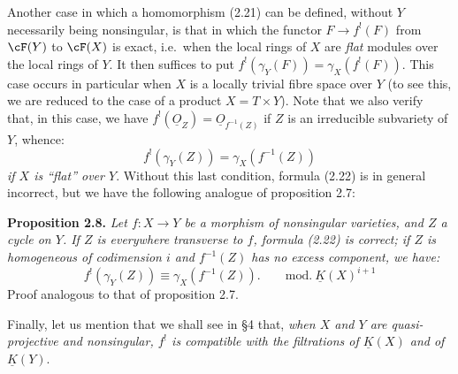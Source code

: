 Another case in which a homomorphism (2.21) can be defined, without $Y$ necessarily being nonsingular, is that in which the functor $F\to f^!(F)$ from $\cF(Y)$ to $\cF(X)$ is exact, i.e.\ when the local rings of $X$ are \emph{flat} modules over the local rings of $Y$. It then suffices to put $f^!(\gamma_Y(F))=\gamma_X(f^!(F))$.
This case occurs in particular when $X$ is a locally trivial fibre space over $Y$ (to see this, we are reduced to the case of a product $X=T\times Y$). Note that we also verify that, in this case, we have $f^!(\underline{O}_Z)=\underline{O}_{f^{-1}(Z)}$ if $Z$ is an irreducible subvariety of $Y$, whence:
\begin{equation}\tag{2.22}
 f^!(\gamma_Y(Z))=\gamma_X(f^{-1}(Z))
\end{equation}
\emph{if $X$ is ``flat'' over $Y$}. Without this last condition, formula (2.22) is in general incorrect, but we have the following analogue of proposition 2.7:

\textbf{Proposition 2.8.}
\emph{Let $f:X\longrightarrow Y$ be a morphism of nonsingular varieties, and $Z$ a cycle on $Y$. If $Z$ is everywhere transverse to $f$, formula}
%
\emph{(2.22) is correct; if $Z$ is homogeneous of codimension $i$ and $f^{-1}(Z)$ has no excess component, we have:}
\begin{equation}\tag{2.23}
 f^!(\gamma_Y(Z))\equiv\gamma_X(f^{-1}(Z)).\qquad\mathrm{mod.}\ \underline K(X)^{i+1}
\end{equation}
Proof analogous to that of proposition 2.7.

Finally, let us mention that we shall see in \S 4 that, \emph{when $X$ and $Y$ are quasi-projective and nonsingular, $f^!$ is compatible with the filtrations of $\underline K(X)$ and of $\underline K(Y)$}.

